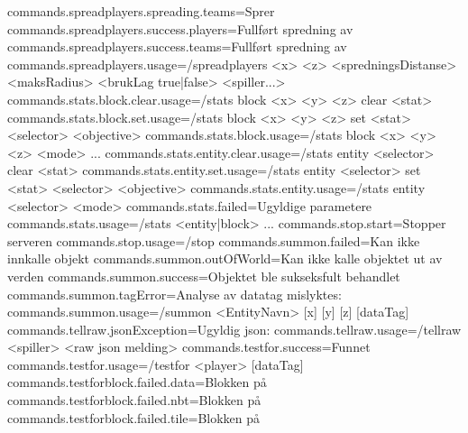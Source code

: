 commands.spreadplayers.spreading.teams=Sprer %
commands.spreadplayers.success.players=Fullført spredning av %
commands.spreadplayers.success.teams=Fullført spredning av %
commands.spreadplayers.usage=/spreadplayers <x> <z> <spredningsDistanse> <maksRadius> <brukLag true|false> <spiller...>
commands.stats.block.clear.usage=/stats block <x> <y> <z> clear <stat>
commands.stats.block.set.usage=/stats block <x> <y> <z> set <stat> <selector> <objective>
commands.stats.block.usage=/stats block <x> <y> <z> <mode> ...
commands.stats.entity.clear.usage=/stats entity <selector> clear <stat>
commands.stats.entity.set.usage=/stats entity <selector> set <stat> <selector> <objective>
commands.stats.entity.usage=/stats entity <selector> <mode>
commands.stats.failed=Ugyldige parametere
commands.stats.usage=/stats <entity|block> ...
commands.stop.start=Stopper serveren
commands.stop.usage=/stop
commands.summon.failed=Kan ikke innkalle objekt
commands.summon.outOfWorld=Kan ikke kalle objektet ut av verden
commands.summon.success=Objektet ble sukseksfult behandlet
commands.summon.tagError=Analyse av datatag mislyktes: %
commands.summon.usage=/summon <EntityNavn> [x] [y] [z] [dataTag]
commands.tellraw.jsonException=Ugyldig json: %
commands.tellraw.usage=/tellraw <spiller> <raw json melding>
commands.testfor.success=Funnet %
commands.testfor.usage=/testfor <player> [dataTag]
commands.testforblock.failed.data=Blokken på %
commands.testforblock.failed.nbt=Blokken på %
commands.testforblock.failed.tile=Blokken på %
